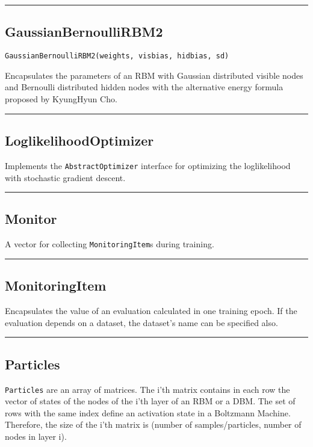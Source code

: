 \noindent\rule{\textwidth}{1pt}
\subsection*{GaussianBernoulliRBM2}
\begin{verbatim}
GaussianBernoulliRBM2(weights, visbias, hidbias, sd)
\end{verbatim}
Encapsulates the parameters of an RBM with Gaussian distributed visible nodes and Bernoulli distributed hidden nodes with the alternative energy formula proposed by KyungHyun Cho.

\noindent\rule{\textwidth}{1pt}
\subsection*{LoglikelihoodOptimizer}
Implements the \texttt{AbstractOptimizer} interface for optimizing the loglikelihood with stochastic gradient descent.

\noindent\rule{\textwidth}{1pt}
\subsection*{Monitor}
A vector for collecting \texttt{MonitoringItem}s during training.

\noindent\rule{\textwidth}{1pt}
\subsection*{MonitoringItem}
Encapsulates the value of an evaluation calculated in one training epoch. If the evaluation depends on a dataset, the dataset's name can be specified also.

\noindent\rule{\textwidth}{1pt}
\subsection*{Particles}
\texttt{Particles} are an array of matrices. The i'th matrix contains in each row the vector of states of the nodes of the i'th layer of an RBM or a DBM. The set of rows with the same index define an activation state in a Boltzmann Machine. Therefore, the size of the i'th matrix is (number of samples/particles, number of nodes in layer i).

